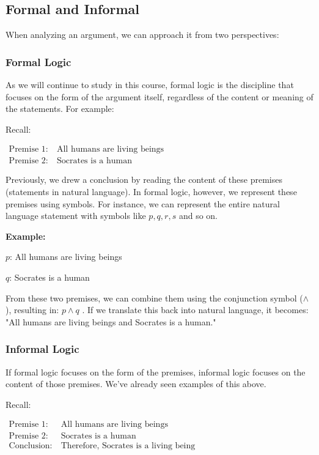 \documentclass[12pt,a4paper,openany]{article}
\begin{document}
\subsection{Formal and Informal}

When analyzing an argument, we can approach it from two perspectives:

\subsubsection{Formal Logic} 

As we will continue to study in this course, formal logic is the discipline that focuses on the form of the argument itself, regardless of the content or meaning of the statements. For example:

Recall:

$
\begin{aligned}
\text{Premise 1:} \ & \text{All humans are living beings} \\
\text{Premise 2:} \ & \text{Socrates is a human}
\end{aligned}
$

Previously, we drew a conclusion by reading the content of these premises (statements in natural language). In formal logic, however, we represent these premises using symbols. For instance, we can represent the entire natural language statement with symbols like $p, q, r, s$ and so on.

\textbf{Example:}

$p$: All humans are living beings

$q$: Socrates is a human

From these two premises, we can combine them using the conjunction symbol ($ \land $), resulting in: $p \land q$ . If we translate this back into natural language, it becomes: "All humans are living beings and Socrates is a human."

\subsubsection{Informal Logic}

If formal logic focuses on the form of the premises, informal logic focuses on the content of those premises. We’ve already seen examples of this above.

Recall:

$
\begin{aligned}
\text{Premise 1:} \ & \text{All humans are living beings} \\
\text{Premise 2:} \ & \text{Socrates is a human} \\
\text{Conclusion:} \ & \text{Therefore, Socrates is a living being}
\end{aligned}
$
\end{document}
